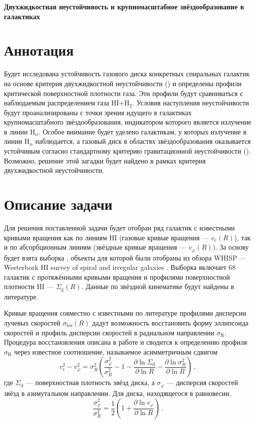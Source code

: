 \documentclass[russian,12pt]{article}
\def\bc{\begin{center}}
\def\ec{\end{center}}
\begin{document}
\bc
\Large\bf 
Двухжидкостная неустойчивость и крупномасштабное звёздообразование в 
галактиках
\ec

\section{Аннотация}

Будет исследована устойчивость газового диска конкретных спиральных 
галактик на основе критерия двухжидкостной неустойчивости 
(\citealt{JS84,Efstathiou00}) и определены профили критической поверхностной 
плотности газа. Эти профили будут сравниваться с наблюдаемым распределением 
газа HI$+$H$_2$. Условия наступления неустойчивости будут проанализированы 
с точки зрения идущего в галактиках крупномасштабного звёздообразования, 
индикатором которого является излучение в линии H$_\alpha$. Особое внимание 
будет уделено галактикам, у которых излучение в линии H$_\alpha$ наблюдается, 
а газовый диск в областях звёздообразования оказывается устойчивым согласно 
стандартному критерию гравитационной неустойчивости 
(\citealt{Toomre64,GL_B65,Kennicutt89}). 
Возможно, решение этой загадки будет найдено в рамках критерия 
двухжидкостной неустойчивости.

\section{Описание задачи}

Для решения поставленной задачи будет отобран ряд галактик с известными 
кривыми вращения как по линиям HI (газовые кривые вращения --- 
$v_\mathrm{c}(R)$), так и по абсорбционным линиям (звёздные кривые 
вращения --- $v_\varphi(R)$). За основу будет взята выборка 
\cite{Noordermeer+05}, объекты для которой были отобраны из обзора WHISP --- 
Westerbork HI survey of spiral and irregular galaxies 
\citep{Kamphius+96,vanderHulst+01}. Выборка \cite{Noordermeer+05} включает 
68 галактик с протяжёнными кривыми вращения и профилями поверхностной 
плотности HI --- $\Sigma_\mathrm{g}(R)$. 
Данные по звёздной кинематике будут найдены в литературе.

Кривые вращения совместно с известными по литературе профилями 
дисперсии лучевых скоростей $\sigma_\mathrm{los}(R)$ дадут возможность 
восстановить форму эллипсоида скоростей и профиль дисперсии скоростей в 
радиальном направлении $\sigma_\mathrm{R}$. Процедура восстановления 
описана в работе \cite{Sil'chenko+11} и сводится к определению 
профиля $\sigma_\mathrm{R}$ через известное соотношение, называемое 
асимметричным сдвигом %
\begin{equation}
v_\mathrm{c}^2 - v_\varphi^2 = 
\sigma_R^2 \left( 
\frac{\sigma_\varphi^2}{\sigma_R^2} -1 - 
\frac{\partial \ln \Sigma_\mathrm{d}}{\partial \ln R} - 
\frac{\partial \ln \sigma_R^2}{\partial \ln R}
\right) \, ,
\label{AsDr}
\end{equation}
где $\Sigma_\mathrm{d}$ --- поверхностная плотность звёзд диска, а 
$\sigma_\varphi$ --- дисперсия скоростей звёзд в азимутальном 
направлении. Для диска, находящегося в равновесии,
$$
\frac{\sigma_\varphi^2}{\sigma_R^2} = \frac{1}{2} 
\left( 1 + \frac{\partial \ln v_\varphi}{\partial \ln R}\right) 
\, .
$$
\end{document}
